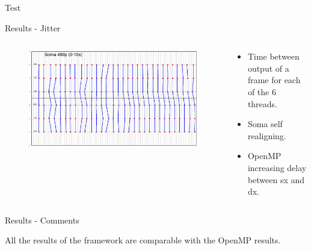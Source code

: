 \documentclass[xcolor=dvipsnames]{beamer}
\begin{document}
\begin{section}{Test}
\begin{frame}{\hskip 0.3cm Results - Jitter}
\begin{columns}
\begin{column}{6.5cm}
\vskip -1cm
\begin{figure}

\includegraphics[scale=0.14]{soma_480_range_010.png}
\end{figure}

\end{column}

\begin{column}{5cm}

\begin{itemize}

\item Time between output of a frame for each of the 6 threads.

\vskip 0.5cm
\item Soma self realigning.

\vskip 0.5cm
\item OpenMP increasing delay between sx and dx.

\end{itemize}

\end{column}

\end{columns}

\end{frame}












\begin{frame}{\hskip 0.3cm Results - Comments}

All the results of the framework are comparable with the OpenMP results.

\begin{itemize}


\end{itemize}
\end{frame}
\end{section}
\end{document}
